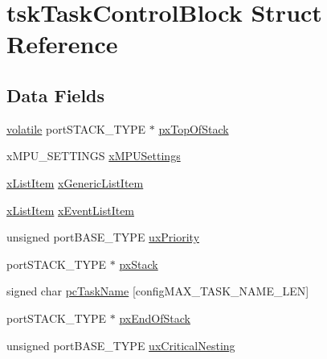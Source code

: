 \hypertarget{structtsk_task_control_block}{\section{tsk\-Task\-Control\-Block Struct Reference}
\label{structtsk_task_control_block}
}
\subsection*{Data Fields}
\begin{DoxyCompactItemize}
\item 
\hyperlink{group___c_m_s_i_s___core___instruction_interface_gad7d93af13046b0378601b85c8c16673b}{volatile} port\-S\-T\-A\-C\-K\-\_\-\-T\-Y\-P\-E $\ast$ \hyperlink{structtsk_task_control_block_a4ebd83cb3a10ec0f6113f9c3c13aeacc}{px\-Top\-Of\-Stack}
\item 
x\-M\-P\-U\-\_\-\-S\-E\-T\-T\-I\-N\-G\-S \hyperlink{structtsk_task_control_block_a6f500824434d6eb2ddd3df036f33cdac}{x\-M\-P\-U\-Settings}
\item 
\hyperlink{_common_2_libraries_2_free_r_t_o_s_2_source_2include_2list_8h_abc3e65a10b5c5f39142e64e69311797f}{x\-List\-Item} \hyperlink{structtsk_task_control_block_a95eb5853a94644043605770f63ac9a63}{x\-Generic\-List\-Item}
\item 
\hyperlink{_common_2_libraries_2_free_r_t_o_s_2_source_2include_2list_8h_abc3e65a10b5c5f39142e64e69311797f}{x\-List\-Item} \hyperlink{structtsk_task_control_block_a9b0ee1554f116853c7631dc0b585ffdc}{x\-Event\-List\-Item}
\item 
unsigned port\-B\-A\-S\-E\-\_\-\-T\-Y\-P\-E \hyperlink{structtsk_task_control_block_a82357f7be508ac5d27ae7968cddde6da}{ux\-Priority}
\item 
port\-S\-T\-A\-C\-K\-\_\-\-T\-Y\-P\-E $\ast$ \hyperlink{structtsk_task_control_block_a072d4f408be6a2364c56010e47dc7096}{px\-Stack}
\item 
signed char \hyperlink{structtsk_task_control_block_ab151b08171a6a64ce7b926e2773b0ed8}{pc\-Task\-Name} \mbox{[}config\-M\-A\-X\-\_\-\-T\-A\-S\-K\-\_\-\-N\-A\-M\-E\-\_\-\-L\-E\-N\mbox{]}
\item 
port\-S\-T\-A\-C\-K\-\_\-\-T\-Y\-P\-E $\ast$ \hyperlink{structtsk_task_control_block_a4005efd890c0fd0feda944ef59be146f}{px\-End\-Of\-Stack}
\item 
unsigned port\-B\-A\-S\-E\-\_\-\-T\-Y\-P\-E \hyperlink{structtsk_task_control_block_a608d77a8a8fa5080525c900ceb7a540b}{ux\-Critical\-Nesting}
\item 

\end{DoxyCompactItemize}

